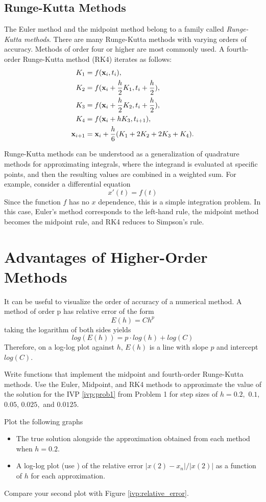 \subsection*{Runge-Kutta Methods}
The Euler method and the midpoint method belong to a family called \textit{Runge-Kutta methods}.
There are many Runge-Kutta methods with varying orders of accuracy.
Methods of order four or higher are most commonly used.
A fourth-order Runge-Kutta method (RK4) iterates as follows: 
\begin{align*}
	\begin{split}
K_1 &= f(\mathbf{x}_i,t_i), \\
K_2 &= f(\mathbf{x}_i + \frac{h}{2} K_1,t_i + \frac{h}{2}),\\
K_3 &= f(\mathbf{x}_i + \frac{h}{2} K_2,t_i + \frac{h}{2}),\\
K_4 &= f(\mathbf{x}_i + h K_3,t_{i+1}),\\
\mathbf{x}_{i+1} &= \mathbf{x}_i + \frac{h}{6}(K_1 + 2K_2 + 2K_3 + K_4).
	\end{split}
\end{align*}

Runge-Kutta methods can be understood as a generalization of quadrature methods for approximating integrals, where the integrand is evaluated at specific points, and then the resulting values are combined in a weighted sum.
For example, consider a differential equation 
$$x'(t) = f(t)$$
Since the function $f$ has no $x$ dependence, this is a simple integration problem.
In this case, Euler's method corresponds to the left-hand rule, the midpoint method becomes the midpoint rule, and RK4 reduces to Simpson's rule.

\section*{Advantages of Higher-Order Methods}
It can be useful to visualize the order of accuracy of a numerical method.
A method of order p has relative error of the form
$$E(h) = Ch^p$$
taking the logarithm of both sides yields
$$log(E(h)) =p \cdot log(h) + log(C)$$
Therefore, on a log-log plot against $h$, $E(h)$ is a line with slope $p$ and intercept $log(C)$.

\begin{problem} Write functions that implement the midpoint and fourth-order Runge-Kutta methods.
Use the Euler, Midpoint, and RK4 methods to approximate the value of the solution for the IVP \eqref{ivp:prob1} from Problem 1 for step sizes of $h = 0.2,$ $ 0.1,$ $0.05 $, $0.025,$ and $0.0125.$

Plot the following graphs
\begin{itemize}
\item The true solution alongside the approximation obtained from each method when $h=0.2$.
\item A log-log plot (use ) of the relative error $|x(2)-x_n|/{|x(2)|}$ as a function of $h$ for each approximation.
\end{itemize}

Compare your second plot with Figure \ref{ivp:relative_error}.
\end{problem}

